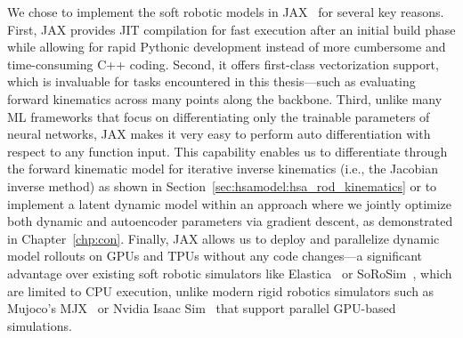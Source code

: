 We chose to implement the soft robotic models in JAX~\citep{jax2018github} for several key reasons. First, JAX provides \gls{JIT} compilation for fast execution after an initial build phase while allowing for rapid Pythonic development instead of more cumbersome and time-consuming C++ coding. Second, it offers first-class vectorization support, which is invaluable for tasks encountered in this thesis—such as evaluating forward kinematics across many points along the backbone. Third, unlike many \gls{ML} frameworks that focus on differentiating only the trainable parameters of neural networks, JAX makes it very easy to perform auto differentiation with respect to any function input. This capability enables us to differentiate through the forward kinematic model for iterative inverse kinematics (i.e., the Jacobian inverse method) as shown in Section~\ref{sec:hsamodel:hsa_rod_kinematics} or to implement a latent dynamic model within an approach where we jointly optimize both dynamic and autoencoder parameters via gradient descent, as demonstrated in Chapter~\ref{chp:con}. Finally, JAX allows us to deploy and parallelize dynamic model rollouts on \glspl{GPU} and \glspl{TPU} without any code changes—a significant advantage over existing soft robotic simulators like Elastica~\citep{naughton2021elastica} or SoRoSim~\citep{mathew2022sorosim}, which are limited to CPU execution, unlike modern rigid robotics simulators such as Mujoco’s MJX~\citep{todorov2012mujoco} or Nvidia Isaac Sim~\citep{makoviychuk2021isaac} that support parallel GPU-based simulations.

